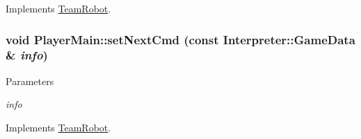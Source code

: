Implements \hyperlink{classTeamRobot_a34c0fd6986c510d4025e5752b3c0e49a}{TeamRobot}.

\hypertarget{classPlayerMain_a8f0320189df15529662c7f16d2f74084}{
\subsubsection[{setNextCmd}]{\setlength{\rightskip}{0pt plus 5cm}void PlayerMain::setNextCmd (const {\bf Interpreter::GameData} \& {\em info})}}
\label{classPlayerMain_a8f0320189df15529662c7f16d2f74084}

\begin{DoxyParams}{Parameters}
\item[{\em info}]\end{DoxyParams}


Implements \hyperlink{classTeamRobot_a65f9a2b7464dfac3f4a0336810cf574f}{TeamRobot}.



